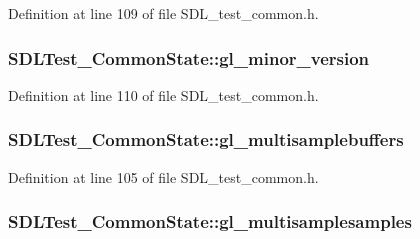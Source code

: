 Definition at line 109 of file S\-D\-L\-\_\-test\-\_\-common.\-h.

\hypertarget{struct_s_d_l_test___common_state_a5a50c65004454c791da21a3473388608}{
\subsubsection[{gl\-\_\-minor\-\_\-version}]{ S\-D\-L\-Test\-\_\-\-Common\-State\-::gl\-\_\-minor\-\_\-version}}\label{struct_s_d_l_test___common_state_a5a50c65004454c791da21a3473388608}


Definition at line 110 of file S\-D\-L\-\_\-test\-\_\-common.\-h.

\hypertarget{struct_s_d_l_test___common_state_a083f7381809b23f0ac3a9a8de562f70c}{
\subsubsection[{gl\-\_\-multisamplebuffers}]{ S\-D\-L\-Test\-\_\-\-Common\-State\-::gl\-\_\-multisamplebuffers}}\label{struct_s_d_l_test___common_state_a083f7381809b23f0ac3a9a8de562f70c}


Definition at line 105 of file S\-D\-L\-\_\-test\-\_\-common.\-h.

\hypertarget{struct_s_d_l_test___common_state_a96718b47862d4962e4a7ae9a62ce4a30}{
\subsubsection[{gl\-\_\-multisamplesamples}]{ S\-D\-L\-Test\-\_\-\-Common\-State\-::gl\-\_\-multisamplesamples}}\label{struct_s_d_l_test___common_state_a96718b47862d4962e4a7ae9a62ce4a30}


